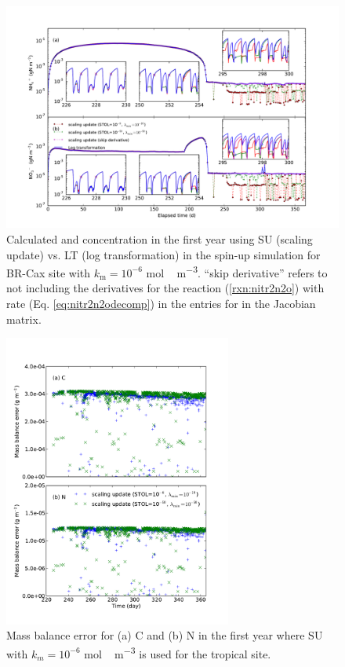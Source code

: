 \documentclass[gmd, manuscript]{copernicus}
\begin{document}
\begin{figure}[t]
\includegraphics[width=1.0\textwidth]{../figs/fig14/cax1y2.pdf}
\caption{Calculated  and  concentration in the first
year using SU (scaling update) vs. LT (log transformation) in the spin-up
simulation for BR-Cax site with $k_\text{m} = 10^{-6}$ \unit{mol\,m^{-3}}.
``skip derivative'' refers to not including the derivatives for the reaction
(\ref{rxn:nitr2n2o}) with rate (Eq. \ref{eq:nitr2n2odecomp}) in
the entries for  in the Jacobian matrix.}
\label{fig:cax1y}
\end{figure}

\begin{figure}[t]
\includegraphics[width=7.5cm]{../figs/fig17/mbe.pdf}
\caption{Mass balance error for (a) C and (b) N in the first year where SU with
$k_m = 10^{-6}$ \unit{mol\,m^{-3}} is used for the tropical site.}
\label{fig:mbe}
\end{figure}
\end{document}
